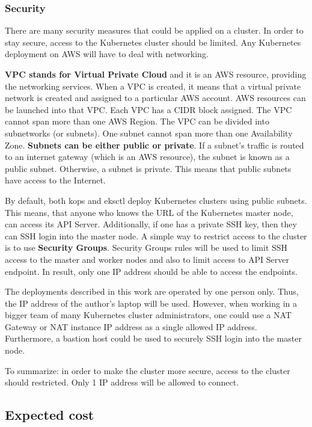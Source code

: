 \subsubsection{Security}

There are many security measures that could be applied on a cluster. In order to stay secure, access to the Kubernetes cluster should be limited. Any Kubernetes deployment on AWS will have to deal with networking.

\textbf{VPC stands for Virtual Private Cloud} and it is an AWS resource, providing the networking services. When a VPC is created, it means that a virtual private network is created and assigned to a particular AWS account. AWS resources can be launched into that VPC. Each VPC has a CIDR block assigned. The VPC cannot span more than one AWS Region. The VPC can be divided into subnetworks (or subnets). One subnet cannot span more than one Availability Zone. \textbf{Subnets can be either public or private}. If a subnet's traffic is routed to an internet gateway (which is an AWS resource), the subnet is known as a public subnet. Otherwise, a subnet is private\cite{aws-vpc}. This means that public subnets have access to the Internet.

By default, both kops and eksctl deploy Kubernetes clusters using public subnets. This means, that anyone who knows the URL of the Kubernetes master node, can access its API Server. Additionally, if one has a private SSH key, then they can SSH login into the master node. A simple way to restrict access to the cluster is to use \textbf{Security Groups}. Security Groups rules will be used to limit SSH access to the master and worker nodes and also to limit access to API Server endpoint\cite{online-kops-cs}. In result, only one IP address should be able to access the endpoints.

The deployments described in this work are operated by one person only. Thus, the IP address of the author's laptop will be used. However, when working in a bigger team of many Kubernetes cluster administrators, one could use a NAT Gateway or NAT instance IP address as a single allowed IP address. Furthermore, a bastion host could be used to securely SSH login into the master node\cite{aws-bastion}.

To summarize: in order to make the cluster more secure, access to the cluster should restricted. Only 1 IP address will be allowed to connect.

\subsection{Expected cost}

